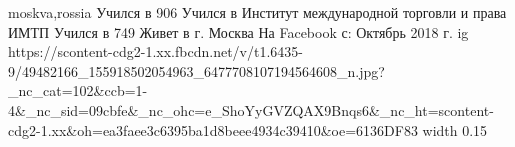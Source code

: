 
 
 
 
 

\par
moskva,rossia
Учился в 906
Учился в Институт международной торговли и права ИМТП
Учился в 749
Живет в г. Москва
На Facebook с: Октябрь 2018 г.
\ifcmt
  ig https://scontent-cdg2-1.xx.fbcdn.net/v/t1.6435-9/49482166_155918502054963_6477708107194564608_n.jpg?_nc_cat=102&ccb=1-4&_nc_sid=09cbfe&_nc_ohc=e_ShoYyGVZQAX9Bnqs6&_nc_ht=scontent-cdg2-1.xx&oh=ea3faee3c6395ba1d8beee4934c39410&oe=6136DF83
  width 0.15
\fi

